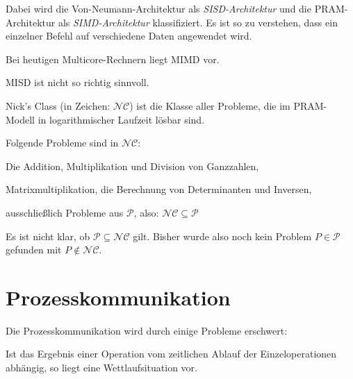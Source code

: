 Dabei wird die Von-Neumann-Architektur als \textit{SISD-Architektur} und die
PRAM-Architektur als \textit{SIMD-Architektur} klassifiziert. Es ist so zu
verstehen, dass ein einzelner Befehl auf verschiedene Daten angewendet wird.

Bei heutigen Multicore-Rechnern liegt MIMD vor.

MISD ist nicht so richtig sinnvoll.

\begin{definition}%
    Nick's Class (in Zeichen: $\mathcal{NC}$) ist die Klasse aller Probleme,
    die im PRAM-Modell in logarithmischer Laufzeit lösbar sind.
\end{definition}

\begin{beispiel}%
    Folgende Probleme sind in $\mathcal{NC}$:
    \begin{bspenum}
        \item Die Addition, Multiplikation und Division von Ganzzahlen,
        \item Matrixmultiplikation, die Berechnung von Determinanten und Inversen,
        \item ausschließlich Probleme aus $\mathcal{P}$, also: $\mathcal{NC} \subseteq \mathcal{P}$
    \end{bspenum}

    Es ist nicht klar, ob $\mathcal{P} \subseteq \mathcal{NC}$ gilt. Bisher 
    wurde also noch kein Problem $P \in \mathcal{P}$ gefunden mit $P \notin \mathcal{NC}$.
\end{beispiel}

\section{Prozesskommunikation}
Die Prozesskommunikation wird durch einige Probleme erschwert:

\begin{definition}[Wettlaufsituation]%
    Ist das Ergebnis einer Operation vom zeitlichen Ablauf der Einzeloperationen
    abhängig, so liegt eine Wettlaufsituation vor.
\end{definition}

